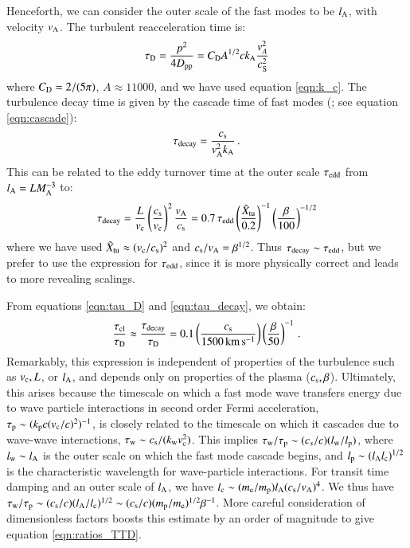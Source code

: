 \documentclass[fleqn,usenatbib,useAMS]{mnras}
\begin{document}
Henceforth, we can consider the outer scale of the fast modes to be $l_{\rm A}$, with velocity $v_{\rm A}$. The turbulent reacceleration time is: 
\begin{equation}
\tau_{\rm D} = \frac{p^{2}}{4 D_{\rm pp}} = C_{\rm D} A^{1/2} c k_{\rm A} \frac{v_{A}^{2}}{c_{\rm S}^{2}}
\label{eqn:tau_D} 
\end{equation}
where $C_{\rm D} = 2/(5 \pi)$, $A\approx 11000$, and we have used equation \ref{eqn:k_c}. The turbulence decay time is given by the cascade time of fast modes (\citet{yan04}; see equation \ref{eqn:cascade}): 
\begin{equation}
\tau_{\rm decay} = \frac{c_{\rm s}}{v_{\rm A}^{2} k_{\rm A}}\,.
\label{eqn:tau_decay} 
\end{equation} 
This can be related to the eddy turnover time at the outer scale $\tau_{\rm edd}$ from $l_{\rm A} = L M_{\rm A}^{-3}$ to: 
\begin{equation}
\tau_{\rm decay} =\frac{L}{v_{\rm c}} \left(\frac{c_{\rm s}}{v_{\rm c}} \right)^{2} \frac{v_{\rm A}}{c_{\rm s}} = 0.7 \, \tau_{\rm edd} \left(\frac{\tilde{X}_{\rm tu}}{0.2}\right)^{-1}  \left(\frac{\beta}{100} \right)^{-1/2}
\end{equation}
where we have used $\tilde{X}_{\rm tu} \approx (v_{\rm c}/c_{\rm s})^{2}$ and $c_{\rm s}/v_{\rm A} = \beta^{1/2}$. Thus $\tau_{\rm decay} \sim \tau_{\rm edd}$, but we prefer to use the expression for $\tau_{\rm edd}$, since it is more physically correct and leads to more revealing scalings. 

From equations \ref{eqn:tau_D} and \ref{eqn:tau_decay}, we obtain:
\begin{equation}
\frac{\tau_{\rm cl}}{\tau_{\rm D}} \approx \frac{\tau_{\rm decay}}{\tau_{\rm D}} = 0.1 \left( \frac{c_{\rm s}}{1500 \, {\rm km \, s^{-1}}} \right) \left( \frac{\beta}{50} \right)^{-1}\,. 
\label{eqn:ratios_TTD} 
\end{equation}
Remarkably, this expression is independent of properties of the turbulence such as $v_{\rm c},L$, or $l_{\rm A}$, and depends only on properties of the plasma ($c_{\rm s},\beta$). Ultimately, this arises because the timescale on which a fast mode wave transfers energy due to wave particle interactions in second order Fermi acceleration, $\tau_{\rm p} \sim (k_{\rm p} c (v_{\rm c}/c)^{2} )^{-1}$, is closely related to the timescale on which it cascades due to wave-wave interactions, $\tau_{\rm w} \sim c_{\rm s}/(k_{\rm w} v_{\rm c}^{2})$. This implies $\tau_{\rm w}/\tau_{\rm p} \sim (c_{s}/c)(l_{\rm w}/l_{\rm p})$, where $l_{\rm w} \sim l_{\rm A}$ is the outer scale on which the fast mode cascade begins, and $l_{\rm p} \sim (l_{\rm A} l_{\rm c})^{1/2}$ is the characteristic wavelength for wave-particle interactions. For transit time damping and an outer scale of $l_{\rm A}$, we have $l_{\rm c} \sim (m_{\rm e}/m_{\rm p}) l_{\rm A} (c_{\rm s}/v_{\rm A})^{4}$. We thus have $\tau_{\rm w}/\tau_{\rm p} \sim (c_{\rm s}/c)(l_{\rm A}/l_{\rm c})^{1/2} \sim (c_{\rm s}/c) (m_{\rm p}/m_{\rm e})^{1/2} \beta^{-1}$. More careful consideration of dimensionless factors boosts this estimate by an order of magnitude to give equation \ref{eqn:ratios_TTD}. 
\end{document}
